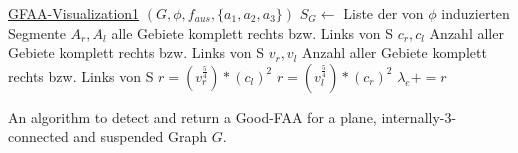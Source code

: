 \begin{algorithm}
	\underline{GFAA-Visualization1} $(G,\phi,f_{aus},\{a_1,a_2,a_3\})$\;
	$S_G \longleftarrow$ Liste der von $\phi$ induzierten Segmente\;
		{ 
		$A_r,A_l$ \longleftarrow alle Gebiete komplett rechts bzw. Links von S\;
		$c_r,c_l$ \longleftarrow Anzahl aller Gebiete komplett rechts bzw. Links von S\;
		$v_r,v_l$ \longleftarrow Anzahl aller Gebiete komplett rechts bzw. Links von S\;
			{
			$r = (v_r^{\frac{5}{4}})*(c_l)^2$\;
			$r = (v_l^{\frac{5}{4}})*(c_r)^2$\;
			}
			{
			$\lambda_e += r$
			}
		}
	\caption{An algorithm to detect and return a Good-FAA for a plane, internally-3-connected and suspended Graph $G$.}
\end{algorithm}